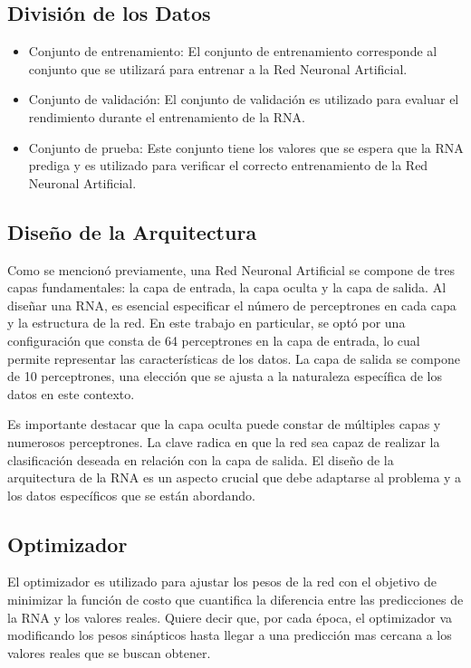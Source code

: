 \documentclass[journal]{IEEEtai}
\begin{document}
\subsection{División de los Datos}

\begin{itemize}
\item	Conjunto de entrenamiento: El conjunto de entrenamiento corresponde al conjunto que se utilizará para entrenar a la Red Neuronal Artificial. 
\item	Conjunto de validación: El conjunto de validación es utilizado para evaluar el rendimiento durante el entrenamiento de la RNA.
\item	Conjunto de prueba: Este conjunto tiene los valores que se espera que la RNA prediga  y es utilizado para verificar el correcto entrenamiento de la Red Neuronal Artificial.
\end{itemize}

\subsection{Diseño de la Arquitectura}

Como se mencionó previamente, una Red Neuronal Artificial se compone de tres capas fundamentales: la capa de entrada, la capa oculta y la capa de salida. Al diseñar una RNA, es esencial especificar el número de perceptrones en cada capa y la estructura de la red. En este trabajo en particular, se optó por una configuración que consta de 64 perceptrones en la capa de entrada, lo cual permite representar las características de los datos. La capa de salida se compone de 10 perceptrones, una elección que se ajusta a la naturaleza específica de los datos en este contexto.

Es importante destacar que la capa oculta puede constar de múltiples capas y numerosos perceptrones. La clave radica en que la red sea capaz de realizar la clasificación deseada en relación con la capa de salida. El diseño de la arquitectura de la RNA es un aspecto crucial que debe adaptarse al problema y a los datos específicos que se están abordando.

\subsection{Optimizador}

El optimizador es utilizado para ajustar los pesos de la red con el objetivo de minimizar la función de costo que cuantifica la diferencia entre las predicciones de la RNA y los valores reales. Quiere decir que, por cada época, el optimizador va modificando los pesos sinápticos hasta llegar a una predicción mas cercana a los valores reales que se buscan obtener.
\end{document}
